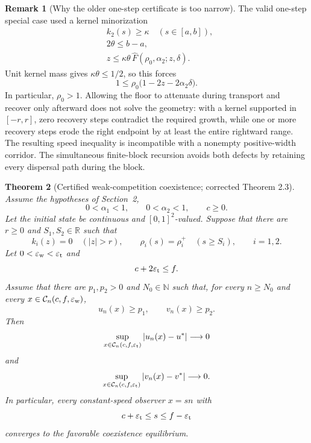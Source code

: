 \documentclass[11pt]{article}
\newtheorem{theorem}{Theorem}[section]
\theoremstyle{definition}
\newtheorem{remark}[theorem]{Remark}
\newcommand{\R}{\mathbb R}
\newcommand{\N}{\mathbb N}
\newcommand{\Fhat}{\widehat F}
\begin{document}
\begin{remark}[Why the older one-step certificate is too narrow]
The valid one-step special case used a kernel minorization
\begin{align}
 &k_2(s)\geq\kappa\quad(s\in[a,b]),
   \label{eq:exclusion-minorization}\\
 &2\theta\leq b-a,
   \label{eq:exclusion-width}\\
 &z\leq\kappa\theta\,
      \Fhat(\rho_0,\alpha_2;z,\delta).
   \label{eq:exclusion-reproduction}
\end{align}
Unit kernel mass gives \(\kappa\theta\leq1/2\), so this forces
\begin{equation}\label{eq:exclusion-certificate-necessary}
  1\leq
  \rho_0\bigl(1-2z-2\alpha_2\delta\bigr).
\end{equation}
In particular, \(\rho_0>1\).  Allowing the floor to attenuate during
transport and recover only afterward does not solve the geometry: with a
kernel supported in \([-r,r]\), zero recovery steps contradict the required
growth, while one or more recovery steps erode the right endpoint by at least
the entire rightward range.  The resulting speed inequality is incompatible
with a nonempty positive-width corridor.  The simultaneous finite-block
recursion avoids both defects by retaining every dispersal path during the
block.
\end{remark}

\begin{theorem}[Certified weak-competition coexistence; corrected Theorem 2.3]
\label{thm:global-coexistence}
Assume the hypotheses of Section~2,
\[
  0<\alpha_1<1,\qquad 0<\alpha_2<1,\qquad c\geq0.
\]
Let the initial state be continuous and \([0,1]^2\)-valued.
Suppose that there are \(r\geq0\) and \(S_1,S_2\in\R\) such that
\[
  k_i(z)=0\quad(|z|>r),
  \qquad
  \rho_i(s)=\rho_i^+\quad(s\geq S_i),
  \qquad i=1,2.
\]
Let \(0<\varepsilon_{\rm w}<\varepsilon_{\rm t}\) and
\[
  c+2\varepsilon_{\rm t}\leq f.
\]
Assume that there are \(p_1,p_2>0\) and \(N_0\in\N\) such that, for every
\(n\geq N_0\) and every
\(x\in\mathcal C_n(c,f,\varepsilon_{\rm w})\),
\begin{equation}\label{eq:coex-positive-floors}
  u_n(x)\geq p_1,
  \qquad
  v_n(x)\geq p_2.
\end{equation}
Then
\[
  \sup_{x\in\mathcal C_n(c,f,\varepsilon_{\rm t})}
  |u_n(x)-u^*|
  \longrightarrow0
\]
and
\[
  \sup_{x\in\mathcal C_n(c,f,\varepsilon_{\rm t})}
  |v_n(x)-v^*|
  \longrightarrow0.
\]
In particular, every constant-speed observer \(x=sn\) with
\[
  c+\varepsilon_{\rm t}\leq s\leq f-\varepsilon_{\rm t}
\]
converges to the favorable coexistence equilibrium.
\end{theorem}
\end{document}
